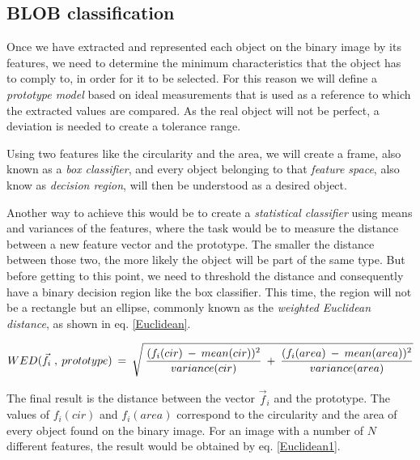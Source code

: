 {%

\subsection{BLOB classification}
Once we have extracted and represented each object on the binary image by its features, we need to determine the minimum characteristics that the object has to comply to, in order for it to be selected. For this reason we will define a \textit{prototype model} based on ideal measurements that is used as a reference to which the extracted values are compared. As the real object will not be perfect, a deviation is needed to create a tolerance range.

Using two features like the circularity and the area, we will create a frame, also known as a \textit{box classifier}, and every object belonging to that \textit{feature space}, also know as \textit{decision region}, will then be understood as a desired object.

Another way to achieve this would be to create a \textit{statistical classifier} using means and variances of the features, where the task would be to measure the distance between a new feature vector and the prototype. The smaller the distance between those two, the more likely the object will be part of the same type. But before getting to this point, we need to threshold the distance and consequently have a binary decision region like the box classifier. This time, the region will not be a rectangle but an ellipse, commonly known as the \textit{weighted Euclidean distance}, as shown in eq. \ref{Euclidean}.

\begin{equation}	
	\begin{aligned}
{WED(\vec{f}_{i} \; , \: prototype)} \: = \: \sqrt{\mathstrut \:  \displaystyle\frac{(f_{i}(cir) \: - \: mean(cir))^2}{variance(cir)} \: + \: \displaystyle\frac{(f_{i}(area) \: - \: mean(area))^2}{variance(area)}}
\label{Euclidean}
	\end{aligned}
\end{equation}

The final result is the distance between the vector {$\vec{f}_{i}$} and the prototype. The values of {$f_{i}(cir)$} and {$f_{i}(area)$} correspond to the circularity and the area of every object found on the binary image. For an image with a number of {$N$} different features, the result would be obtained by eq. \ref{Euclidean1}.

}
